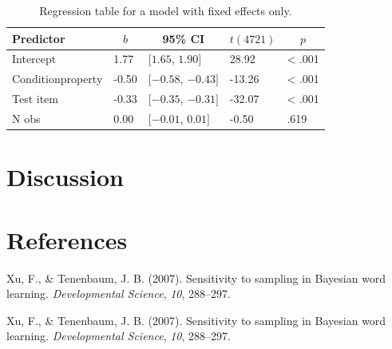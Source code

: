 \documentclass[
  man,floatsintext]{apa6}
\begin{document}
\begin{table}[tbp]
\begin{center}
\begin{threeparttable}
\caption{\label{tab:regression}Regression table for a model with fixed effects only.}
\begin{tabular}{lllll}
\toprule
Predictor & \multicolumn{1}{c}{$b$} & \multicolumn{1}{c}{95\% CI} & \multicolumn{1}{c}{$t(4721)$} & \multicolumn{1}{c}{$p$}\\
\midrule
Intercept & 1.77 & $[1.65$, $1.90]$ & 28.92 & < .001\\
Conditionproperty & -0.50 & $[-0.58$, $-0.43]$ & -13.26 & < .001\\
Test item & -0.33 & $[-0.35$, $-0.31]$ & -32.07 & < .001\\
N obs & 0.00 & $[-0.01$, $0.01]$ & -0.50 & .619\\
\bottomrule
\end{tabular}
\end{threeparttable}
\end{center}
\end{table}

\hypertarget{discussion}{%
\section{Discussion}\label{discussion}}

\newpage

\hypertarget{references}{%
\section{References}\label{references}}

\begingroup
\setlength{\parindent}{-0.5in}
\setlength{\leftskip}{0.5in}

\hypertarget{refs}{}
\leavevmode\hypertarget{ref-xut07a}{}%
Xu, F., \& Tenenbaum, J. B. (2007). Sensitivity to sampling in Bayesian word learning. \emph{Developmental Science}, \emph{10}, 288--297.

\leavevmode\hypertarget{ref-xut07a}{}%
Xu, F., \& Tenenbaum, J. B. (2007). Sensitivity to sampling in Bayesian word learning. \emph{Developmental Science}, \emph{10}, 288--297.

\endgroup
\end{document}
